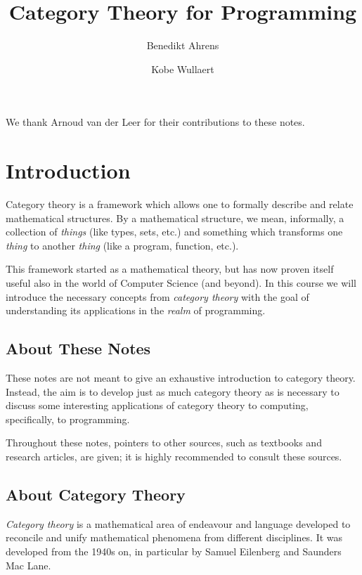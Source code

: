 \documentclass[a4paper,10pt]{scrartcl}
\title{Category Theory for Programming}
\author{Benedikt Ahrens \and Kobe Wullaert}
\theoremstyle{plain}
\theoremstyle{definition}
\begin{document}
\maketitle

\vspace*{\fill}
We thank Arnoud van der Leer for their contributions to these notes.
\vspace*{\fill}


\newpage
\tableofcontents
\newpage


\section{Introduction}

Category theory is a framework which allows one to formally describe and relate mathematical structures. By a mathematical structure, we mean, informally, a collection of \textit{things} (like types, sets, etc.) and something which transforms one \textit{thing} to another \textit{thing} (like a program, function, etc.).

This framework started as a mathematical theory, but has now proven itself useful also in the world of Computer Science (and beyond). In this course we will introduce the necessary concepts from \textit{category theory} with the goal of understanding its applications in the \textit{realm} of programming.


\subsection{About These Notes}

These notes are not meant to give an exhaustive introduction to category theory.
Instead, the aim is to develop just as much category theory as is necessary to discuss some interesting applications of category theory to computing, specifically, to programming.

Throughout these notes, pointers to other sources, such as textbooks and research articles, are given;
it is highly recommended to consult these sources.

\subsection{About Category Theory}

\emph{Category theory} is a mathematical area of endeavour and language developed to reconcile and unify mathematical phenomena from different disciplines.
It was developed from the 1940s on, in particular by Samuel Eilenberg and Saunders Mac Lane.
\end{document}
